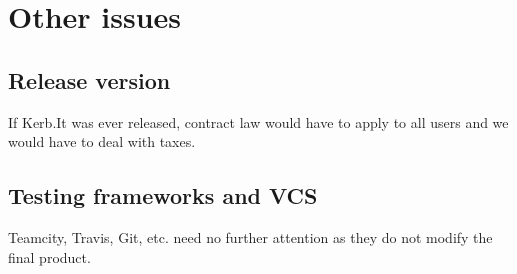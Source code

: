 \documentclass[a4wide, 11pt]{article}
\begin{document}
\section{Other issues}

\subsection{Release version}

If Kerb.It was ever released, contract law would have to apply to all users and we would have to deal with taxes.

\subsection{Testing frameworks and VCS}

Teamcity, Travis, Git, etc. need no further attention as they do not modify the final product.
\end{document}
